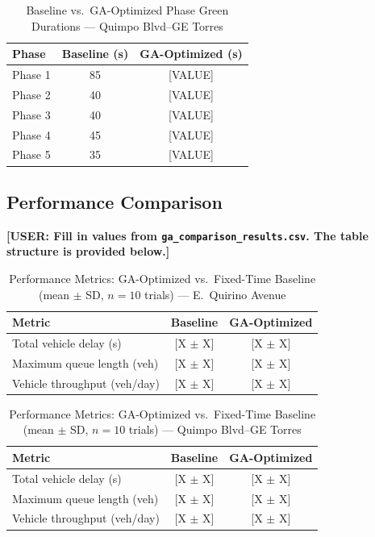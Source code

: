 \documentclass[a4paper,10pt]{article}
\begin{document}
	\begin{table}[h]
	\centering
	\caption{Baseline vs.\ GA-Optimized Phase Green Durations --- Quimpo Blvd--GE Torres}
	\begin{tabular}{lcc}
	\hline
	Phase & Baseline (s) & GA-Optimized (s) \\
	\hline
	Phase 1 & 85 & {[VALUE]} \\
	Phase 2 & 40 & {[VALUE]} \\
	Phase 3 & 40 & {[VALUE]} \\
	Phase 4 & 45 & {[VALUE]} \\
	Phase 5 & 35 & {[VALUE]} \\
	\hline
	\end{tabular}
	\end{table}

	\subsection{Performance Comparison}

	\textbf{[USER: Fill in values from \texttt{ga\_comparison\_results.csv}.
	The table structure is provided below.]}

	\begin{table}[h]
	\centering
	\caption{Performance Metrics: GA-Optimized vs.\ Fixed-Time Baseline
	(mean $\pm$ SD, $n = 10$ trials) --- E.~Quirino Avenue}
	\begin{tabular}{lcc}
	\hline
	Metric & Baseline & GA-Optimized \\
	\hline
	Total vehicle delay (s)      & {[X $\pm$ X]} & {[X $\pm$ X]} \\
	Maximum queue length (veh)   & {[X $\pm$ X]} & {[X $\pm$ X]} \\
	Vehicle throughput (veh/day) & {[X $\pm$ X]} & {[X $\pm$ X]} \\
	\hline
	\end{tabular}
	\end{table}

	\begin{table}[h]
	\centering
	\caption{Performance Metrics: GA-Optimized vs.\ Fixed-Time Baseline
	(mean $\pm$ SD, $n = 10$ trials) --- Quimpo Blvd--GE Torres}
	\begin{tabular}{lcc}
	\hline
	Metric & Baseline & GA-Optimized \\
	\hline
	Total vehicle delay (s)      & {[X $\pm$ X]} & {[X $\pm$ X]} \\
	Maximum queue length (veh)   & {[X $\pm$ X]} & {[X $\pm$ X]} \\
	Vehicle throughput (veh/day) & {[X $\pm$ X]} & {[X $\pm$ X]} \\
	\hline
	\end{tabular}
	\end{table}
\end{document}
